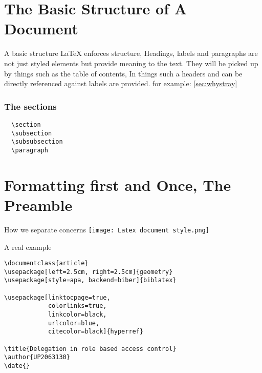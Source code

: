 \documentclass[notes]{beamer}
\begin{document}
\section{The Basic Structure of A Document}
\begin{frame}{A basic structure}
	\LaTeX{} enforces structure, Headings, labels and paragraphs are not just
	styled elements but provide meaning to the text. They will be picked up by
	things such as the table of contents, In things such a headers and can be
	directly referenced against labels are provided. for example: \ref{sec:whystray}
\end{frame}

\begin{frame}[fragile]
  \frametitle{The sections}
\begin{verbatim}
  \section
  \subsection
  \subsubsection
  \paragraph
\end{verbatim}
\end{frame}

\section{Formatting first and Once, The Preamble}%
\begin{frame}{How we separate concerns}
	\texttt{[image: Latex document style.png]}
\end{frame}
\begin{frame}[fragile]{A real example}

\begin{verbatim}
\documentclass{article}
\usepackage[left=2.5cm, right=2.5cm]{geometry}
\usepackage[style=apa, backend=biber]{biblatex}

\usepackage[linktocpage=true,
            colorlinks=true,
            linkcolor=black,
            urlcolor=blue,
            citecolor=black]{hyperref}

\title{Delegation in role based access control}
\author{UP2063130}
\date{}
\end{verbatim}

\end{frame}
\end{document}
